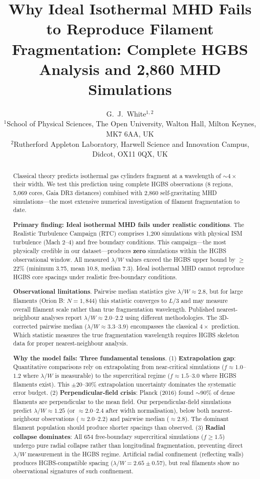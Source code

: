 \documentclass[twocolumn,longtitle,usenatbib]{mnras}
\title{Why Ideal Isothermal MHD Fails to Reproduce Filament Fragmentation: Complete HGBS Analysis and 2,860 MHD Simulations}
\author[G.~J.~White]{G.~J.~White$^{1,2}$\\
$^{1}$School of Physical Sciences, The Open University, Walton Hall, Milton Keynes, MK7 6AA, UK\\
$^{2}$Rutherford Appleton Laboratory, Harwell Science and Innovation Campus, Didcot, OX11 0QX, UK}
\begin{document}
\maketitle

\begin{abstract}
Classical theory predicts isothermal gas cylinders fragment at a wavelength of $\sim4\times$ their width. We test this prediction using complete HGBS observations (8 regions, 5,069 cores, Gaia DR3 distances) combined with 2,860 self-gravitating MHD simulations---the most extensive numerical investigation of filament fragmentation to date.

\textbf{Primary finding: Ideal isothermal MHD fails under realistic conditions}. The Realistic Turbulence Campaign (RTC) comprises 1,200 simulations with physical ISM turbulence (Mach 2--4) and free boundary conditions. This campaign---the most physically credible in our dataset---produces \textbf{zero} simulations within the HGBS observational window. All measured $\lambda/W$ values exceed the HGBS upper bound by $\geq$22\% (minimum 3.75, mean 10.8, median 7.3). Ideal isothermal MHD cannot reproduce HGBS core spacings under realistic free-boundary conditions.

\textbf{Observational limitations}. Pairwise median statistics give $\lambda/W \approx 2.8$, but for large filaments (Orion B: $N = 1,844$) this statistic converges to $L/3$ and may measure overall filament scale rather than true fragmentation wavelength. Published nearest-neighbour analyses report $\lambda/W \approx 2.0$--$2.2$ using different methodologies. The 3D-corrected pairwise median ($\lambda/W \approx 3.3$--$3.9$) encompasses the classical $4\times$ prediction. Which statistic measures the true fragmentation wavelength requires HGBS skeleton data for proper nearest-neighbour analysis.

\textbf{Why the model fails: Three fundamental tensions}. (1) \textbf{Extrapolation gap}: Quantitative comparisons rely on extrapolating from near-critical simulations ($f \approx 1.0$--$1.2$ where $\lambda/W$ is measurable) to the supercritical regime ($f \approx 1.5$--$3.0$ where HGBS filaments exist). This $\pm$20--30\% extrapolation uncertainty dominates the systematic error budget. (2) \textbf{Perpendicular-field crisis}: Planck (2016) found $\sim$90\% of dense filaments are perpendicular to the mean field. Our perpendicular-field simulations predict $\lambda/W \approx 1.25$ (or $\approx 2.0$--$2.4$ after width normalisation), below both nearest-neighbour observations ($\approx 2.0$--$2.2$) and pairwise median ($\approx 2.8$). The dominant filament population should produce shorter spacings than observed. (3) \textbf{Radial collapse dominates}: All 654 free-boundary supercritical simulations ($f \geq 1.5$) undergo pure radial collapse rather than longitudinal fragmentation, preventing direct $\lambda/W$ measurement in the HGBS regime. Artificial radial confinement (reflecting walls) produces HGBS-compatible spacing ($\lambda/W = 2.65 \pm 0.57$), but real filaments show no observational signatures of such confinement.


\end{abstract}
\end{document}
